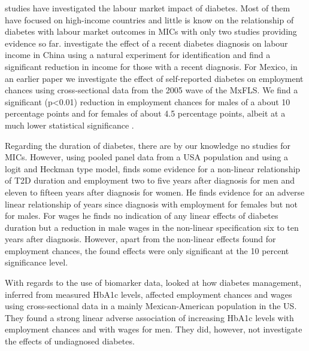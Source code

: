 studies have investigated the labour market impact of diabetes. Most
of them have focused on high-income countries and little is know on
the relationship of diabetes with labour market outcomes in \ac{MICs}
with only two studies providing evidence so far. \citet{Liu2014}
investigate the effect of a recent diabetes diagnosis on labour income
in China using a natural experiment for identification and find a
significant reduction in income for those with a recent diagnosis.
For Mexico, in an earlier paper we investigate the effect of self-reported
diabetes on employment chances using cross-sectional data from the
2005 wave of the \ac{MxFLS}. We find a significant (p<0.01) reduction
in employment chances for males of a about 10 percentage points and
for females of about 4.5 percentage points, albeit at a much lower
statistical significance \citep{Seuring2015}.

Regarding the duration of diabetes, there are by our knowledge no
studies for \ac{MICs}. However, using pooled panel data from a
\ac{USA} population and using a logit and Heckman type model, \citet{Minor2013}
finds some evidence for a non-linear relationship of \ac{T2D} duration
and employment two to five years after diagnosis for men and eleven
to fifteen years after diagnosis for women. He finds evidence for
an adverse linear relationship of years since diagnosis with employment
for females but not for males. For wages he finds no indication of
any linear effects of diabetes duration but a reduction in male wages
in the non-linear specification six to ten years after diagnosis.
However, apart from the non-linear effects found for employment chances,
the found effects were only significant at the 10 percent significance
level.

With regards to the use of biomarker data,\citet{BrownIII2011} looked
at how diabetes management, inferred from measured \ac{HbA1c} levels,
affected employment chances and wages using cross-sectional data in
a mainly Mexican-American population in the US. They found a strong
linear adverse association of increasing \ac{HbA1c} levels with
employment chances and with wages for men. They did, however, not investigate the effects of undiagnosed diabetes.

